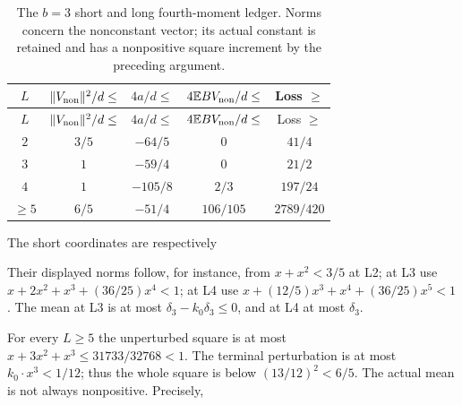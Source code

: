 \begingroup\small
\renewcommand{\arraystretch}{1.15}
\begin{longtable}{@{}ccccc@{}}
\caption{The \(b=3\) short and long fourth-moment ledger.
Norms concern the nonconstant vector; its actual constant is retained
and has a nonpositive square increment by the preceding argument.}
\label{tab:odd188:short-outlet}\label{tab:parameters:q5-c188:2}\\
\toprule
\(L\)&\(\|V_{\rm non}\|^2/d\le\)&\(4a/d\le\)
     &\(4\mathbb E BV_{\rm non}/d\le\)&Loss \(\ge\)\\
\midrule\endfirsthead
\toprule
\(L\)&\(\|V_{\rm non}\|^2/d\le\)&\(4a/d\le\)
     &\(4\mathbb E BV_{\rm non}/d\le\)&Loss \(\ge\)\\
\midrule\endhead
\bottomrule\endfoot
\(2\)&\(3/5\)&\(-64/5\)&\(0\)&\(41/4\)\\
\(3\)&\(1\)&\(-59/4\)&\(0\)&\(21/2\)\\
\(4\)&\(1\)&\(-105/8\)&\(2/3\)&\(197/24\)\\
\(\ge5\)&\(6/5\)&\(-51/4\)&\(106/105\)&\(2789/420\)\\
\end{longtable}
\endgroup


The short coordinates are respectively



Their displayed norms follow, for instance, from \(x+x^2<3/5\) at L2; at L3 use \(x+2x^2+x^3+(36/25)x^4<1\); at L4 use \(x+(12/5)x^3+x^4+(36/25)x^5<1\). The mean at L3 is at most \(\delta_3-k_{0}\delta_3\le 0\), and at L4 at most \(\delta_3\).

For every \(L\ge 5\) the unperturbed square is at most \(x+3x^2+x^3\le 31733/32768<1\). The terminal perturbation is at most \(k_{0}\cdot x^3<1/12\); thus the whole square is below \((13/12)^2<6/5\). The actual mean is not always nonpositive. Precisely,



